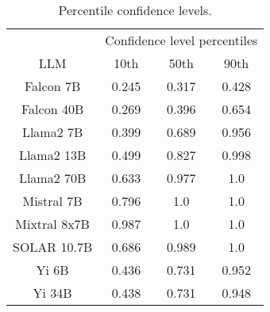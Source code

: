 \begin{table*}
\centering
\begin{tabular}{c|c|c|c}
& \multicolumn{3}{c}{Confidence level percentiles} \\ 
LLM & 10th & 50th & 90th\\ \hline
Falcon 7B & 0.245 & 0.317 & 0.428\\
Falcon 40B & 0.269 & 0.396 & 0.654\\
Llama2 7B & 0.399 & 0.689 & 0.956\\
Llama2 13B & 0.499 & 0.827 & 0.998\\
Llama2 70B & 0.633 & 0.977 & 1.0\\
Mistral 7B & 0.796 & 1.0 & 1.0\\
Mixtral 8x7B & 0.987 & 1.0 & 1.0\\
SOLAR 10.7B & 0.686 & 0.989 & 1.0\\
Yi 6B & 0.436 & 0.731 & 0.952\\
Yi 34B & 0.438 & 0.731 & 0.948\\
\hline
\end{tabular}
\caption{Percentile confidence levels.}
\label{tab:percentile_conf}
\end{table*}
